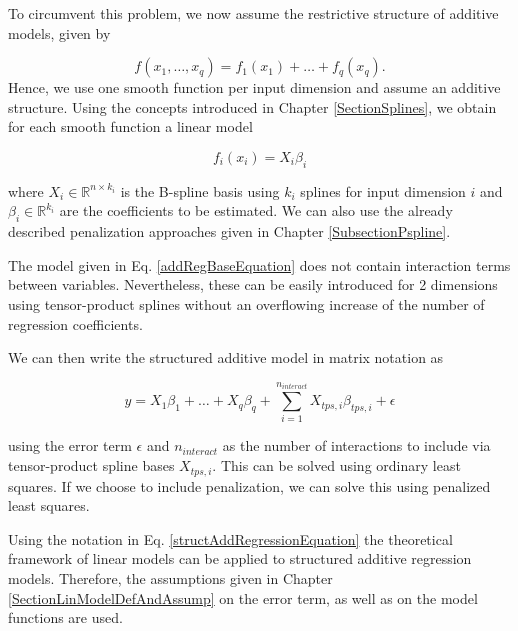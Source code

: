 To circumvent this problem, we now assume the restrictive structure of additive models, given by

\begin{equation} \label{addRegBaseEquation}
	f(x_1, \dots, x_q) = f_1(x_1) + \dots + f_q(x_q). 
\end{equation}
Hence, we use one smooth function per input dimension and assume an additive structure. \cite{fahrmeir2013regression} Using the concepts introduced in Chapter \ref{SectionSplines}, we obtain for each smooth function a linear model

$$f_i(x_i) = X_i \beta_i$$

where $X_i \in \mathbb R^{n \times k_i}$ is the B-spline basis using $k_i$ splines for input dimension $i$ and $\beta_i \in \mathbb R^{k_i}$ are the coefficients to be estimated. We can also use the already described penalization approaches given in Chapter \ref{SubsectionPspline}. 

The model given in Eq. \ref{addRegBaseEquation} does not contain interaction terms between variables. Nevertheless, these can be easily introduced for 2 dimensions using tensor-product splines without an overflowing increase of the number of regression coefficients.

We can then write the structured additive model in matrix notation as 

\begin{equation} \label{structAddRegressionEquation}
	y = X_1\beta_1 + \dots + X_q\beta_q + \sum_{i=1}^{n_{interact}} X_{tps, i} \beta_{tps,i} + \epsilon
\end{equation}

using the error term $\epsilon$ and $n_{interact}$ as the number of interactions to include via tensor-product spline bases $X_{tps,i}$. This can be solved using ordinary least squares. If we choose to include penalization, we can solve this using penalized least squares. 

Using the notation in Eq. \ref{structAddRegressionEquation} the theoretical framework of linear models can be applied to structured additive regression models. Therefore, the assumptions given in Chapter \ref{SectionLinModelDefAndAssump} on the error term, as well as on the model functions are used. \cite{fahrmeir2004penalized}


